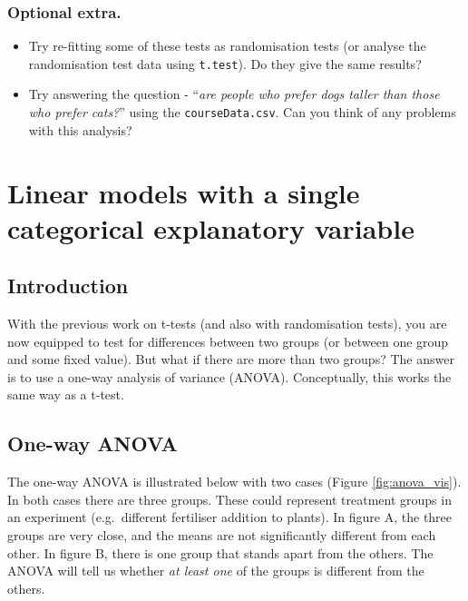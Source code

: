 \documentclass[
  a4paperpaper,
]{book}
\begin{document}
\hypertarget{optional-extra.}{%
\subsection{Optional extra.}\label{optional-extra.}}

\begin{itemize}
\item
  Try re-fitting some of these tests as randomisation tests (or analyse the randomisation test data using \texttt{t.test}). Do they give the same results?
\item
  Try answering the question - ``\emph{are people who prefer dogs taller than those who prefer cats?}'' using the \texttt{courseData.csv}. Can you think of any problems with this analysis?
\end{itemize}

\hypertarget{linear-models-with-a-single-categorical-explanatory-variable}{%
\chapter{Linear models with a single categorical explanatory variable}\label{linear-models-with-a-single-categorical-explanatory-variable}}

\hypertarget{introduction}{%
\section{Introduction}\label{introduction}}

With the previous work on t-tests (and also with randomisation tests), you are now equipped to test for differences between two groups (or between one group and some fixed value). But what if there are more than two groups? The answer is to use a one-way analysis of variance (ANOVA). Conceptually, this works the same way as a t-test.

\hypertarget{one-way-anova}{%
\section{One-way ANOVA}\label{one-way-anova}}

The one-way ANOVA is illustrated below with two cases (Figure \ref{fig:anova_vis}). In both cases there are three groups. These could represent treatment groups in an experiment (e.g.~different fertiliser addition to plants). In figure A, the three groups are very close, and the means are not significantly different from each other. In figure B, there is one group that stands apart from the others. The ANOVA will tell us whether \emph{at least one} of the groups is different from the others.
\end{document}
